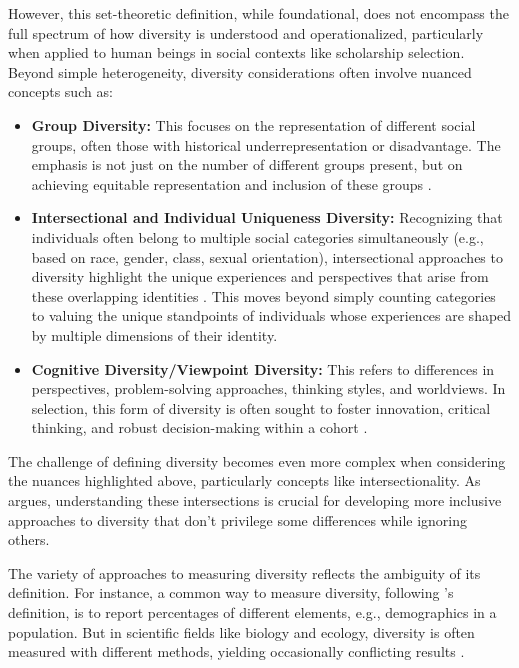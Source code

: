 However, this set-theoretic definition, while foundational, does not encompass the full spectrum of how diversity is understood and operationalized, particularly when applied to human beings in social contexts like scholarship selection. Beyond simple heterogeneity, diversity considerations often involve nuanced concepts such as:
\begin{itemize}
    \item \textbf{Group Diversity:} This focuses on the representation of different social groups, often those with historical underrepresentation or disadvantage. The emphasis is not just on the number of different groups present, but on achieving equitable representation and inclusion of these groups \cite{Mitchell_Diversity_2020,Stirling_General_2007}.
    \item \textbf{Intersectional and Individual Uniqueness Diversity:} Recognizing that individuals often belong to multiple social categories simultaneously (e.g., based on race, gender, class, sexual orientation), intersectional approaches to diversity highlight the unique experiences and perspectives that arise from these overlapping identities \cite{Crenshaw_Demarginalizing_1989,Mitchell_Diversity_2020}. This moves beyond simply counting categories to valuing the unique standpoints of individuals whose experiences are shaped by multiple dimensions of their identity.
    \item \textbf{Cognitive Diversity/Viewpoint Diversity:} This refers to differences in perspectives, problem-solving approaches, thinking styles, and worldviews. In selection, this form of diversity is often sought to foster innovation, critical thinking, and robust decision-making within a cohort \cite{Hong_Page_2004_Diversity}.
\end{itemize}

The challenge of defining diversity becomes even more complex when considering the nuances highlighted above, particularly concepts like intersectionality. As \textcite{collins2002black} argues, understanding these intersections is crucial for developing more inclusive approaches to diversity that don't privilege some differences while ignoring others.

The variety of approaches to measuring diversity reflects the ambiguity of its definition. For instance, a common way to measure diversity, following \textcite{page_diversity_2010}'s definition, is to report percentages of different elements, e.g., demographics in a population. But in scientific fields like biology and ecology, diversity is often measured with different methods, yielding occasionally conflicting results \cite{xu2020diversity}.

